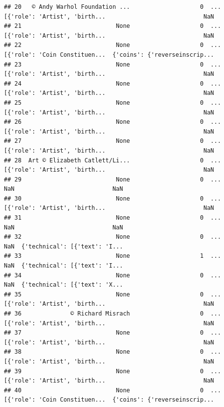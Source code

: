 \documentclass[
]{book}
\begin{document}
\begin{verbatim}
## 20   © Andy Warhol Foundation ...                    0  ...  [{'role': 'Artist', 'birth...                            NaN
## 21                           None                    0  ...  [{'role': 'Artist', 'birth...                            NaN
## 22                           None                    0  ...  [{'role': 'Coin Constituen...  {'coins': {'reverseinscrip...
## 23                           None                    0  ...  [{'role': 'Artist', 'birth...                            NaN
## 24                           None                    0  ...  [{'role': 'Artist', 'birth...                            NaN
## 25                           None                    0  ...  [{'role': 'Artist', 'birth...                            NaN
## 26                           None                    0  ...  [{'role': 'Artist', 'birth...                            NaN
## 27                           None                    0  ...  [{'role': 'Artist', 'birth...                            NaN
## 28  Art © Elizabeth Catlett/Li...                    0  ...  [{'role': 'Artist', 'birth...                            NaN
## 29                           None                    0  ...                            NaN                            NaN
## 30                           None                    0  ...  [{'role': 'Artist', 'birth...                            NaN
## 31                           None                    0  ...                            NaN                            NaN
## 32                           None                    0  ...                            NaN  {'technical': [{'text': 'I...
## 33                           None                    1  ...                            NaN  {'technical': [{'text': 'I...
## 34                           None                    0  ...                            NaN  {'technical': [{'text': 'X...
## 35                           None                    0  ...  [{'role': 'Artist', 'birth...                            NaN
## 36              © Richard Misrach                    0  ...  [{'role': 'Artist', 'birth...                            NaN
## 37                           None                    0  ...  [{'role': 'Artist', 'birth...                            NaN
## 38                           None                    0  ...  [{'role': 'Artist', 'birth...                            NaN
## 39                           None                    0  ...  [{'role': 'Artist', 'birth...                            NaN
## 40                           None                    0  ...  [{'role': 'Coin Constituen...  {'coins': {'reverseinscrip...

\end{verbatim}
\end{document}
